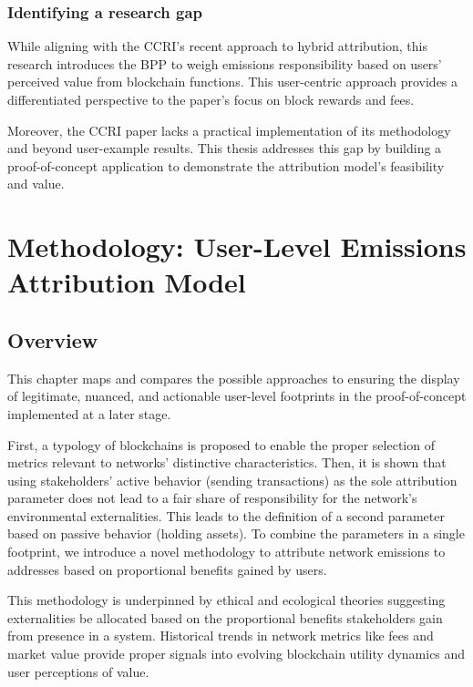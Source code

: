 \documentclass[11pt]{report}
\begin{document}
\subsection{Identifying a research gap}


While aligning with the CCRI's recent approach to hybrid attribution, this research introduces the \ac{BPP} to weigh emissions responsibility based on users' perceived value from blockchain functions. This user-centric approach provides a differentiated perspective to the paper's focus on block rewards and fees.

Moreover, the CCRI paper lacks a practical implementation of its methodology and beyond user-example results. This thesis addresses this gap by building a proof-of-concept application to demonstrate the attribution model's feasibility and value.

\chapter{Methodology: User-Level Emissions Attribution Model}
\section{Overview \label{se:methodology_overview}}


This chapter maps and compares the possible approaches to ensuring the display of legitimate, nuanced, and actionable user-level footprints in the proof-of-concept implemented at a later stage.

First, a typology of blockchains is proposed to enable the proper selection of metrics relevant to networks' distinctive characteristics. Then, it is shown that using stakeholders' active behavior (sending transactions) as the sole attribution parameter does not lead to a fair share of responsibility for the network's environmental externalities. This leads to the definition of a second parameter based on passive behavior (holding assets). To combine the parameters in a single footprint, we introduce a novel methodology to attribute network emissions to addresses based on proportional benefits gained by users.

This methodology is underpinned by ethical and ecological theories suggesting externalities be allocated based on the proportional benefits stakeholders gain from presence in a system. Historical trends in network metrics like fees and market value provide proper signals into evolving blockchain utility dynamics and user perceptions of value.
\end{document}
